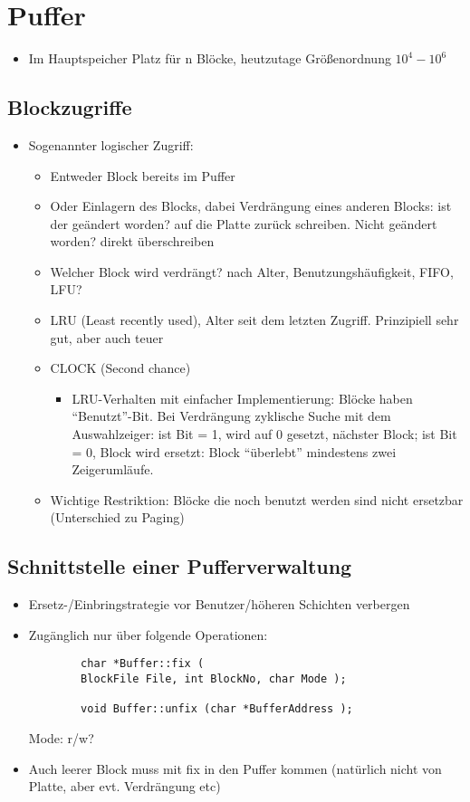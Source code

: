 \documentclass[a4paper, 12pt]{scrartcl}
\begin{document}
\section{Puffer}

\begin{itemize}
	\item
		Im Hauptspeicher Platz für n Blöcke, heutzutage Größenordnung $10^4 - 10^6$
\end{itemize}
\subsection{Blockzugriffe}
\begin{itemize}
	\item
		Sogenannter logischer Zugriff:
		\begin{itemize}
			\item
				Entweder Block bereits im Puffer
			\item
				Oder Einlagern des Blocks, dabei Verdrängung eines anderen Blocks: ist der geändert worden? auf die Platte zurück schreiben. Nicht geändert worden? direkt überschreiben
			\item
				Welcher Block wird verdrängt? nach Alter, Benutzungshäufigkeit, FIFO, LFU?
			\item
				LRU (Least recently used), Alter seit dem letzten Zugriff. Prinzipiell sehr gut, aber auch teuer
			\item
				CLOCK (Second chance)
				\begin{itemize}
					\item LRU-Verhalten mit einfacher Implementierung: Blöcke haben \enquote{Benutzt}-Bit. Bei Verdrängung zyklische Suche mit dem Auswahlzeiger: ist Bit = 1, wird auf 0 gesetzt, nächster Block; ist Bit = 0, Block wird ersetzt: Block \enquote{überlebt} mindestens zwei Zeigerumläufe.
				\end{itemize}
			\item
				Wichtige Restriktion: Blöcke die noch benutzt werden sind nicht ersetzbar (Unterschied zu Paging)
		\end{itemize}

\end{itemize}

\subsection{Schnittstelle einer Pufferverwaltung}
\begin{itemize}
	\item
		Ersetz-/Einbringstrategie vor Benutzer/höheren Schichten verbergen
	\item
		Zugänglich nur über folgende Operationen:
		\begin{lstlisting}
		char *Buffer::fix (
		BlockFile File, int BlockNo, char Mode );

		void Buffer::unfix (char *BufferAddress );
		\end{lstlisting}
		Mode: r/w?
	\item
		Auch leerer Block muss mit fix in den Puffer kommen (natürlich nicht von Platte, aber evt. Verdrängung etc)
\end{itemize}
\end{document}
